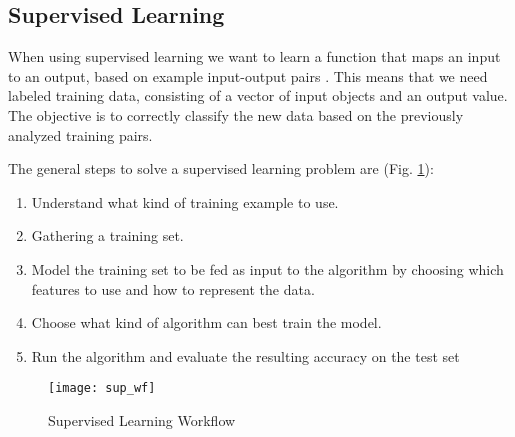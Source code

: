 \subsection{Supervised Learning} \label{supervised}
When using supervised learning we want to learn a function that maps an input to an output, based on example input-output pairs \cite{ai_sup}. This means that we need labeled training data, consisting of a vector of input objects and an output value. The objective is to correctly classify the new data based on the previously analyzed training pairs.

The general steps to solve a supervised learning problem are (Fig. \ref{fig:sup_wf}):
\begin{enumerate}[noitemsep]
	\item Understand what kind of training example to use.
	\item Gathering a training set.
	\item Model the training set to be fed as input to the algorithm by choosing which features to use and how to represent the data.
	\item Choose what kind of algorithm can best train the model.
	\item Run the algorithm and evaluate the resulting accuracy on the test set 
\end{enumerate}

\begin{figure}[H]
	\centering
	\texttt{[image: sup\_wf]}
	\caption{Supervised Learning Workflow \cite{sup_wf}}
	\label{fig:sup_wf}
\end{figure}

